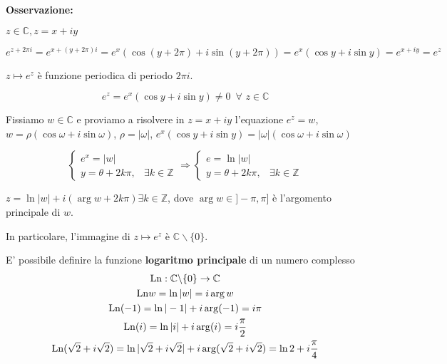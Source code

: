 \textbf{Osservazione:}


$z \in \mathbb{C}, z=x+iy$

$$e^{z+2\pi i}=e^{x+(y+2\pi)i}=e^x(\cos(y+2\pi)+i\sin(y+2\pi))=e^x(\cos y + i \sin y) =e^{x+iy}=e^z$$

$z \mapsto e^z$ è funzione periodica di periodo $2\pi i$.

$$e^z=e^x(\cos y+i \sin y)\neq 0\,\,\, \forall \,\, z \in \mathbb{C}$$

Fissiamo $w \in \mathbb{C}$ e proviamo a risolvere in $z =x+iy$ l'equazione $e^z=w$, $w=\rho (\cos \omega + i \sin \omega)$, $\rho =|\omega|$, $e^x(\cos y+i \sin y)=|\omega|(\cos \omega+i\sin \omega)$

\begin{equation*}
	\begin{cases}
		e^x=|w| 
		\\
		y=\theta+2k\pi, & \exists k\in\mathbb{Z}
	\end{cases} 
	\Rightarrow 
	\begin{cases}
		e=\ln |w|
		\\
		y=\theta+2k\pi, & \exists k\in\mathbb{Z}
	\end{cases}
\end{equation*}

$z =\ln |w|+i(\arg w + 2k\pi) \exists k \in \mathbb{Z}$, dove $\arg w \in ]-\pi,\pi]$ è l'argomento principale di $w$. 

In particolare, l'immagine di $z \mapsto e^z$ è $\mathbb{C} \backslash \{0\}$.

E' possibile definire la funzione \textbf{logaritmo principale} di un numero complesso 
\begin{gather*}
	\mathrm{Ln}: \mathbb{C} \backslash\{0\}\rightarrow \mathbb{C}
	\\
	\mathrm{Ln} w=\ln|w|=i \arg w
	\\
	\mathrm{Ln} (-1)=\ln|-1|+i\arg(-1)=i\pi
	\\
	\mathrm{Ln} (i)=\ln |i|+i\arg(i)=i \frac{\pi}{2}
	\\
	\mathrm{Ln}(\sqrt{2}+i\sqrt{2})=\ln|\sqrt{2}+i\sqrt{2}|+i \arg(\sqrt{2}+i\sqrt{2})=\ln2+i\frac{\pi}{4}
\end{gather*}


